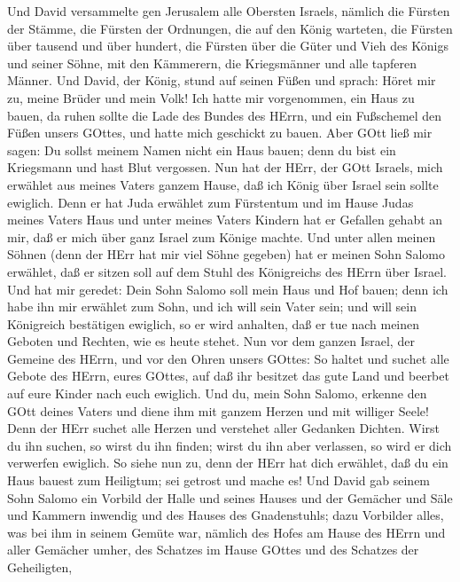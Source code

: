  Und David versammelte gen Jerusalem alle Obersten Israels,
nämlich die Fürsten der Stämme, die Fürsten der Ordnungen, die auf den
König warteten, die Fürsten über tausend und über hundert, die Fürsten
über die Güter und Vieh des Königs und seiner Söhne, mit den Kämmerern,
die Kriegsmänner und alle tapferen Männer.  Und David, der
König, stund auf seinen Füßen und sprach: Höret mir zu, meine Brüder und
mein Volk! Ich hatte mir vorgenommen, ein Haus zu bauen, da ruhen sollte
die Lade des Bundes des HErrn, und ein Fußschemel den Füßen unsers
GOttes, und hatte mich geschickt zu bauen.  Aber GOtt ließ
mir sagen: Du sollst meinem Namen nicht ein Haus bauen; denn du bist ein
Kriegsmann und hast Blut vergossen.  Nun hat der HErr, der
GOtt Israels, mich erwählet aus meines Vaters ganzem Hause, daß ich
König über Israel sein sollte ewiglich. Denn er hat Juda erwählet zum
Fürstentum und im Hause Judas meines Vaters Haus und unter meines Vaters
Kindern hat er Gefallen gehabt an mir, daß er mich über ganz Israel zum
Könige machte.  Und unter allen meinen Söhnen (denn der HErr
hat mir viel Söhne gegeben) hat er meinen Sohn Salomo erwählet, daß er
sitzen soll auf dem Stuhl des Königreichs des HErrn über Israel.
 Und hat mir geredet: Dein Sohn Salomo soll mein Haus und
Hof bauen; denn ich habe ihn mir erwählet zum Sohn, und ich will sein
Vater sein;  und will sein Königreich bestätigen ewiglich,
so er wird anhalten, daß er tue nach meinen Geboten und Rechten, wie es
heute stehet.  Nun vor dem ganzen Israel, der Gemeine des
HErrn, und vor den Ohren unsers GOttes: So haltet und suchet alle Gebote
des HErrn, eures GOttes, auf daß ihr besitzet das gute Land und beerbet
auf eure Kinder nach euch ewiglich.  Und du, mein Sohn
Salomo, erkenne den GOtt deines Vaters und diene ihm mit ganzem Herzen
und mit williger Seele! Denn der HErr suchet alle Herzen und verstehet
aller Gedanken Dichten. Wirst du ihn suchen, so wirst du ihn finden;
wirst du ihn aber verlassen, so wird er dich verwerfen ewiglich.
 So siehe nun zu, denn der HErr hat dich erwählet, daß du
ein Haus bauest zum Heiligtum; sei getrost und mache es! 
Und David gab seinem Sohn Salomo ein Vorbild der Halle und seines Hauses
und der Gemächer und Säle und Kammern inwendig und des Hauses des
Gnadenstuhls;  dazu Vorbilder alles, was bei ihm in seinem
Gemüte war, nämlich des Hofes am Hause des HErrn und aller Gemächer
umher, des Schatzes im Hause GOttes und des Schatzes der Geheiligten,
